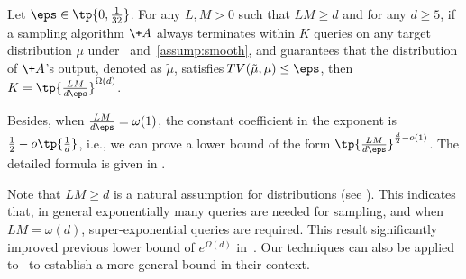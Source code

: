\documentclass[11pt,a4paper]{article}
\newcommand{\DTV}{\!{TV}}
\begin{document}
\begin{theorem}\label{thm:main-lb}
    Let $\eps\in \tp{0,\frac{1}{32}}$. For any $L,M>0$ such that $LM\geq d$ and for any $d\geq 5$, if a sampling algorithm $\+A$ always terminates within $K$ queries on any target distribution $\mu$ under ~and~\ref{assump:smooth}, and guarantees that the distribution of $\+A$'s output, denoted as $\tilde \mu$, satisfies $\DTV(\tilde \mu, \mu)\leq \eps$, then $K = \tp{\frac{LM}{d\eps}}^{\Omega(d)}$.
\end{theorem}
Besides, when $\frac{LM}{d\eps}=\omega(1)$, the constant coefficient in the exponent is $\frac{1}{2}-o\tp{\frac{1}{d}}$, i.e., we can prove a lower bound of the form $\tp{\frac{LM}{d\eps}}^{\frac{d}{2}-o(1)}$. The detailed formula is given in .  



Note that $LM\ge d$ is a natural assumption for distributions (see ). This indicates that, in general exponentially many queries are needed for sampling, and when $LM=\omega(d)$, super-exponential queries are required. This result significantly improved previous lower bound of $e^{\Omega(d)}$ in~\cite{GLR18}. Our techniques can also be applied to~\cite{Cha24} to establish a more general bound in their context.

\end{document}
